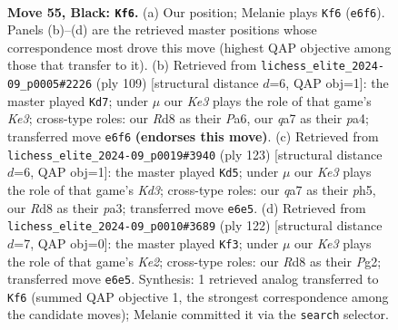 \documentclass[11pt]{article}
\begin{document}
\clearpage

\begin{figure}[p]\centering
\begin{subfigure}{0.46\textwidth}\centering
\resizebox{\linewidth}{!}{%
\newchessgame
\chessboard[
  setfen={3r4/Q7/4k3/8/4P1P1/8/7P/1K6 b - - 0 55},
  showmover=false,
  pgfstyle=straightmove, color=movearrow, markmove={e6-f6}
]}
\caption{}
\end{subfigure}\hfill
\begin{subfigure}{0.46\textwidth}\centering
\resizebox{\linewidth}{!}{%
\newchessgame
\chessboard[
  setfen={8/8/p3k3/8/P2PP3/6B1/2K5/8 b - - 0 55},
  showmover=false,
  pgfstyle=straightmove, color=movearrow, markmove={e6-d7}
]}
\caption{}
\end{subfigure}
\\[4pt]
\begin{subfigure}{0.46\textwidth}\centering
\resizebox{\linewidth}{!}{%
\newchessgame
\chessboard[
  setfen={8/8/3k4/7P/p2P4/P5K1/8/8 b - - 0 62},
  showmover=false,
  pgfstyle=straightmove, color=movearrow, markmove={d6-d5}
]}
\caption{}
\end{subfigure}\hfill
\begin{subfigure}{0.46\textwidth}\centering
\resizebox{\linewidth}{!}{%
\newchessgame
\chessboard[
  setfen={8/6k1/8/7p/8/6p1/4K1P1/1q6 w - - 0 62},
  showmover=false,
  pgfstyle=straightmove, color=movearrow, markmove={e2-f3}
]}
\caption{}
\end{subfigure}
\caption{\textbf{Move 55, Black: \texttt{Kf6}.} (a) Our position; Melanie plays \texttt{Kf6} (\texttt{e6f6}). Panels (b)--(d) are the retrieved master positions whose correspondence most drove this move (highest QAP objective among those that transfer to it). (b) Retrieved from \texttt{lichess\_elite\_2024-09\_p0005\#2226} (ply 109) [structural distance $d$=6, QAP obj=1]: the master played \texttt{Kd7}; under $\mu$ our \emph{Ke3} plays the role of that game's \emph{Ke3}; cross-type roles: our \emph{R}d8 as their \emph{P}a6, our \emph{q}a7 as their \emph{p}a4; transferred move \texttt{e6f6} \textbf{(endorses this move)}. (c) Retrieved from \texttt{lichess\_elite\_2024-09\_p0019\#3940} (ply 123) [structural distance $d$=6, QAP obj=1]: the master played \texttt{Kd5}; under $\mu$ our \emph{Ke3} plays the role of that game's \emph{Kd3}; cross-type roles: our \emph{q}a7 as their \emph{p}h5, our \emph{R}d8 as their \emph{p}a3; transferred move \texttt{e6e5}. (d) Retrieved from \texttt{lichess\_elite\_2024-09\_p0010\#3689} (ply 122) [structural distance $d$=7, QAP obj=0]: the master played \texttt{Kf3}; under $\mu$ our \emph{Ke3} plays the role of that game's \emph{Ke2}; cross-type roles: our \emph{R}d8 as their \emph{P}g2; transferred move \texttt{e6e5}. Synthesis: 1 retrieved analog transferred to \texttt{Kf6} (summed QAP objective 1, the strongest correspondence among the candidate moves); Melanie committed it via the \texttt{search} selector.}
\label{fig:thought-m109}
\end{figure}
\end{document}

